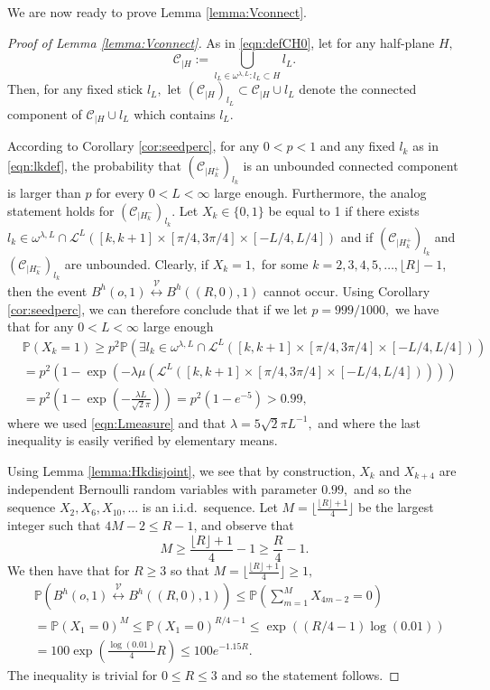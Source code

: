 \documentclass[a4paper,12pt]{article}
\newcommand{\BP}{{\mathbb{P}}}
\newcommand{\CC}{{\mathcal{C}}}
\newcommand{\CL}{{\mathcal{L}}}
\newcommand{\CV}{{\mathcal{V}}}
\begin{document}
We are now ready to prove Lemma \ref{lemma:Vconnect}.

\begin{proof}[Proof of Lemma \ref{lemma:Vconnect}]

As in \eqref{eqn:defCH0}, let for any half-plane $H,$
\[
\CC_{|H}:= \bigcup_{l_L\in \omega^{\lambda,L}: l_L\subset H} l_L.  
\]
Then, for any fixed stick $l_L,$ let
$\left(\CC_{|H}\right)_{l_L}\subset \CC_{|H}\cup l_L$ denote the 
connected component of 
$\CC_{|H} \cup l_L$ which contains $l_L.$


According to Corollary \ref{cor:seedperc}, for any $0<p<1$ 
and any fixed $l_k$ as in \eqref{eqn:lkdef},
the probability that 
$\left(\CC_{|H_k^+}\right)_{l_k}$ is an unbounded connected component is larger than $p$ for every 
$0<L<\infty$ large enough. Furthermore, the analog statement holds for $\left(\CC_{|H_k^-}\right)_{l_k}$. 
Let $X_k\in\{0,1\}$ be equal to 1 if there exists 
$l_k\in \omega^{\lambda,L} \cap \CL^L([k,k+1]\times [\pi/4,3\pi/4]\times[-L/4,L/4])$ 
and if $\left(\CC_{|H_k^+}\right)_{l_k}$ and $\left(\CC_{|H_k^-}\right)_{l_k}$ are unbounded.
Clearly, if $X_k=1,$ for some $k=2,3,4,5,\ldots,\lfloor R \rfloor -1$, then the event 
$B^h(o,1) \stackrel{\CV}{\longleftrightarrow} B^h((R,0),1)$ cannot occur. Using Corollary 
\ref{cor:seedperc}, we can therefore conclude that if we let $p=999/1000,$ we have that
for any $0<L<\infty$ large enough
\begin{align*}
& \BP(X_k=1)\geq p^2 \BP\left(\exists l_k\in \omega^{\lambda,L}\cap 
\CL^L([k,k+1]\times [\pi/4,3\pi/4]\times[-L/4,L/4])\right) \\
& =p^2 \left(1-\exp(-\lambda \mu(\CL^L([k,k+1]\times [\pi/4,3\pi/4]\times[-L/4,L/4])))\right) \\
& =p^2 \left(1-\exp\left(- \frac{\lambda L}{\sqrt{2}\pi}\right)\right)
=p^2\left(1-e^{-5}\right)>0.99,
\end{align*}
where we used \eqref{eqn:Lmeasure} and that $\lambda=5\sqrt{2}\pi L^{-1},$ and where the last 
inequality is easily verified by elementary means.

Using Lemma \ref{lemma:Hkdisjoint}, we see that by construction,
$X_k$ and $X_{k+4}$ are independent Bernoulli random variables with parameter 
$0.99,$ and so the sequence $X_2,X_6,X_{10},\ldots$ 
is an i.i.d.\ sequence. Let $M=\lfloor \frac{\lfloor R \rfloor +1}{4}\rfloor$ be the largest integer 
such that $4M-2\leq R-1$, and observe that 
\[
M \geq \frac{\lfloor R \rfloor +1}{4}-1 \geq \frac{R}{4}-1.
\]
We then have that for $R\geq 3$ so that 
$M=\lfloor \frac{\lfloor R \rfloor +1}{4}\rfloor\geq 1,$
\begin{align*}
& \BP(B^h(o,1) \stackrel{\CV}{\longleftrightarrow} B^h((R,0),1)) 
\leq \BP\left(\sum_{m=1}^{M} X_{4m-2}=0\right) 
\\
&=\BP(X_1=0)^{M} 
\leq  \BP(X_1=0)^{R/4-1} 
\leq \exp\left((R/4-1)\log (0.01)\right) \\
& =100\exp\left(\frac{\log(0.01)}{4}R\right)
\leq 100 e^{-1.15 R}.
\end{align*} 
The inequality is trivial for $0\leq R \leq 3$ and so the statement follows.
\end{proof}
\end{document}
